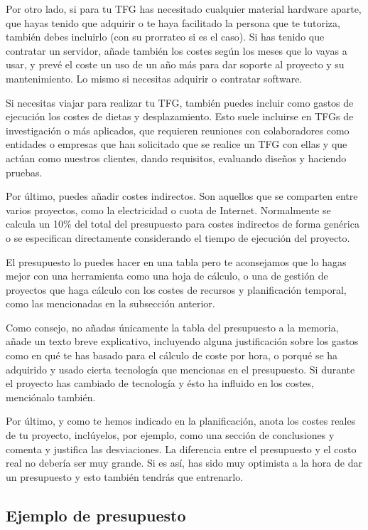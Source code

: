 Por otro lado, si para tu TFG has necesitado cualquier material hardware aparte, que hayas tenido que adquirir o te haya facilitado la persona que te tutoriza, también debes incluirlo (con su prorrateo si es el caso). Si has tenido que contratar un servidor, añade también los costes según los meses que lo vayas a usar, y prevé el coste un uso de un año más para dar soporte al proyecto y su mantenimiento. Lo mismo si necesitas adquirir o contratar software.

Si necesitas viajar para realizar tu TFG, también puedes incluir como gastos de ejecución los costes de dietas y desplazamiento. Esto suele incluirse en TFGs de investigación o más aplicados, que requieren reuniones con colaboradores como entidades o empresas que han solicitado que se realice un TFG con ellas y que actúan como nuestros clientes, dando requisitos, evaluando diseños y haciendo pruebas. 

Por último, puedes añadir costes indirectos. Son aquellos que se comparten entre varios proyectos, como la electricidad o cuota de Internet. Normalmente se calcula un 10\% del total del presupuesto para costes indirectos de forma genérica o se especifican directamente considerando el tiempo de ejecución del proyecto.

El presupuesto lo puedes hacer en una tabla pero te aconsejamos que lo hagas mejor con una herramienta como una hoja de cálculo, o una de gestión de proyectos que haga cálculo con los costes de recursos y planificación temporal, como las mencionadas en la subsección anterior.

Como consejo, no añadas únicamente la tabla del presupuesto a la memoria, añade un texto breve explicativo, incluyendo alguna justificación sobre los gastos como en qué te has basado para el cálculo de coste por hora, o porqué se ha adquirido y usado cierta tecnología que mencionas en el presupuesto. Si durante el proyecto has cambiado de tecnología y ésto ha influido en los costes, menciónalo también.

Por último, y como te hemos indicado en la planificación, anota los costes reales de tu proyecto, inclúyelos, por ejemplo, como una sección de conclusiones y comenta y justifica las desviaciones. La diferencia entre el presupuesto y el costo real no debería ser muy grande. Si es así, has sido muy optimista a la hora de dar un presupuesto y esto también tendrás que entrenarlo.

\subsection{Ejemplo de presupuesto}


